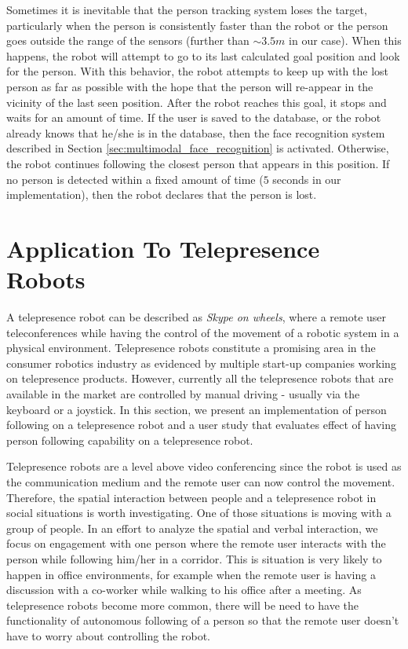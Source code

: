 Sometimes it is inevitable that the person tracking system loses the target, particularly when the person is consistently faster than the robot or the person goes outside the range of the sensors (further than $\sim3.5m$ in our case). When this happens, the robot will attempt to go to its last calculated goal position and look for the person. With this behavior, the robot attempts to keep up with the lost person as far as possible with the hope that the person will re-appear in the vicinity of the last seen position. After the robot reaches this goal, it stops and waits for an amount of time. If the user is saved to the database, or the robot already knows that he/she is in the database, then the face recognition system described in Section \ref{sec:multimodal_face_recognition} is activated. Otherwise, the robot continues following the closest person that appears in this position. If no person is detected within a fixed amount of time ($5$ seconds in our implementation), then the robot declares that the person is lost.




\section{Application To Telepresence Robots}
\label{sec:following_application_to_telepresence}

A telepresence robot can be described as \textit{Skype on wheels}, where a remote user teleconferences while having the control of the movement of a robotic system in a physical environment. Telepresence robots constitute a promising area in the consumer robotics industry as evidenced by multiple start-up companies working on telepresence products. However, currently all the telepresence robots that are available in the market are controlled by manual driving - usually via the keyboard or a joystick. In this section, we present an implementation of person following on a telepresence robot and a user study that evaluates effect of having person following capability on a telepresence robot.

Telepresence robots are a level above video conferencing since the robot is used as the communication medium and the remote user can now control the movement. Therefore, the spatial interaction between people and a telepresence robot in social situations is worth investigating. One of those situations is moving with a group of people. In an effort to analyze the spatial and verbal interaction, we focus on engagement with one person where the remote user interacts with the person while following him/her in a corridor. This is situation is very likely to happen in office environments, for example when the remote user is having a discussion with a co-worker while walking to his office after a meeting. As telepresence robots become more common, there will be need to have the functionality of autonomous following of a person so that the remote user doesn't have to worry about controlling the robot.

